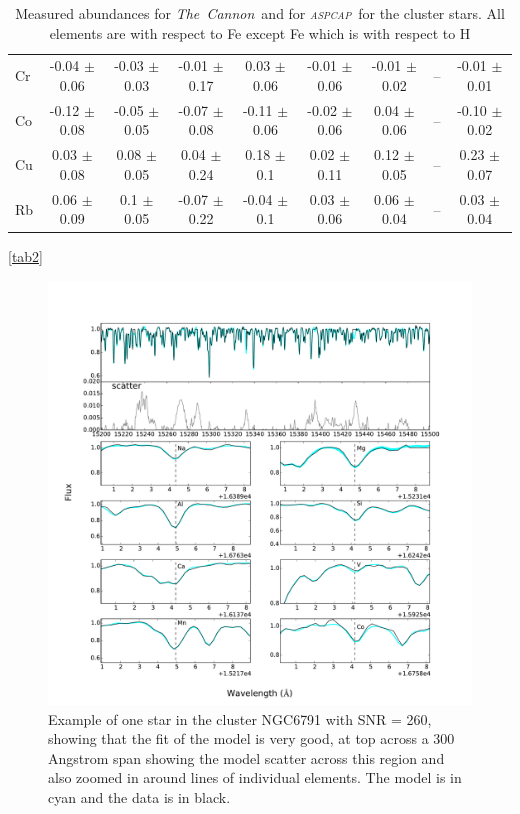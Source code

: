 \documentclass[14pt, preprint2]{aastex6}
\newcommand{\project}[1]{\textsl{#1}}
\newcommand{\tc}{\project{The~Cannon}}
\newcommand{\aspcap}{\project{\textsc{aspcap}}}
\begin{document}
\begin{table}[h]
\begin{tabular}{ | p{} | c| c | c | c | c | c | c | c | }
Cr & -0.04 $\pm$ 0.06 &  -0.03 $\pm$ 0.03 &  -0.01 $\pm$ 0.17  & 0.03 $\pm$ 0.06 & -0.01 $\pm$ 0.06  &-0.01 $\pm$ 0.02  &  -- & -0.01 $\pm$ 0.01 \\
Co & -0.12 $\pm$ 0.08 & -0.05 $\pm$ 0.05  & -0.07 $\pm$ 0.08 & -0.11 $\pm$ 0.06 & -0.02 $\pm$ 0.06 & 0.04 $\pm$ 0.06 & --  & -0.10 $\pm$ 0.02 \\
Cu & 0.03 $\pm$ 0.08  &  0.08 $\pm$ 0.05  & 0.04 $\pm$ 0.24 & 0.18 $\pm$ 0.1  & 0.02 $\pm$ 0.11  & 0.12 $\pm$ 0.05  & --  & 0.23 $\pm$ 0.07 \\
Rb & 0.06 $\pm$ 0.09 & 0.1 $\pm$ 0.05  & -0.07 $\pm$ 0.22  & -0.04 $\pm$ 0.1 & 0.03 $\pm$ 0.06  & 0.06 $\pm$ 0.04  & --  &  0.03 $\pm$ 0.04 \\
 \hline
\end{tabular}
\caption{Measured abundances for \tc\ and for \aspcap\ for the cluster stars. All elements are with respect to Fe except Fe which is with respect to H}
\ref{tab2}
\end{table}


\begin{figure}
\centering
           \includegraphics[scale=0.5]{elementfit.pdf}
  \caption{ Example of one star in the cluster NGC6791 with SNR = 260, showing that the fit of the model is very good, at top across a 300 Angstrom span showing the model scatter across this region and also zoomed in around lines of individual elements. The model is in cyan and the data is in black. }
\label{fig:typical}
\end{figure}
\end{document}
